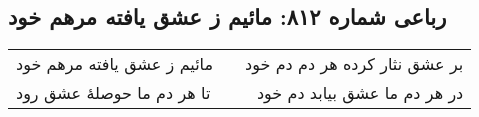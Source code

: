 \begin{center}
\section*{رباعی شماره ۸۱۲: مائیم ز عشق یافته مرهم خود}
\label{sec:0812}
\begin{longtable}{l p{0.5cm} r}
مائیم ز عشق یافته مرهم خود
&&
بر عشق نثار کرده هر دم دم خود
\\
تا هر دم ما حوصلهٔ عشق رود
&&
در هر دم ما عشق بیابد دم خود
\\
\end{longtable}
\end{center}
